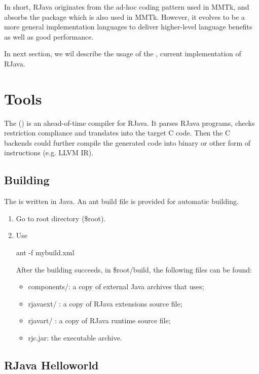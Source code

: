 \documentclass[12pt]{article}
\begin{document}
In short, RJava originates from the ad-hoc coding pattern used in MMTk, and absorbs
the  package which is also used in MMTk. However, it evolves
to be a more general implementation languages to deliver higher-level language benefits
as well as good performance. 

In next section, we wil describe the usage of the \rjcfull, current implementation of RJava. 

\clearpage

\section{\rjcfull Tools}

The \rjcfull (\rjc) is an ahead-of-time compiler for RJava. It parses RJava programs, checks
restriction compliance and translates into the target C code. Then the C backends could further
compile the generated code into binary or other form of instructions (e.g. LLVM IR). 

\subsection{Building \rjc}

The \rjcfull is written in Java. An ant build file is provided for automatic building. 
\begin{enumerate}
\item Go to \rjc root directory (\$root). 
\item Use
\begin{cmd}
ant -f mybuild.xml
\end{cmd}
After the building succeeds, 
in \$root/build, the following files
can be found:
  \begin{itemize}
  \item components/: a copy of external Java archives that \rjc uses;
  \item rjava\textunderscore ext/ : a copy of RJava extensions source file;
  \item rjava\textunderscore rt/ : a copy of RJava runtime source file;
  \item rjc.jar: the executable \rjcfull archive. 
  \end{itemize}
\end{enumerate}

\subsection{RJava Helloworld}
\end{document}
